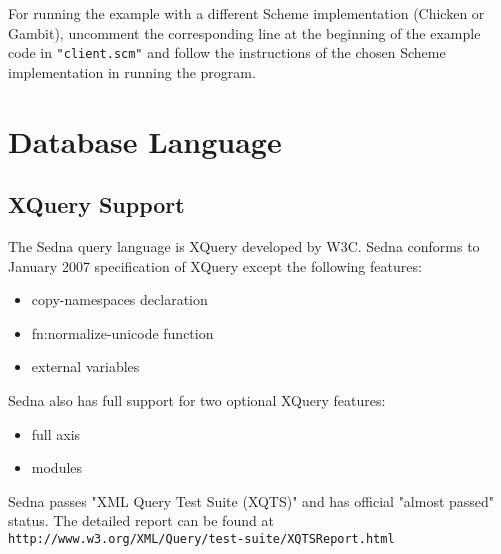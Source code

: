 \documentclass[a4paper,12pt]{article}
\begin{document}
For running the example with a different Scheme implementation (Chicken or
Gambit), uncomment the corresponding line at the beginning of the example code
in \texttt{"client.scm"} and follow the instructions of the chosen Scheme
implementation in running the program.




















%
%
\section{Database Language}
\label{sec:DBLang}

\subsection{XQuery Support}
\label{sec:xquery-support}
The Sedna query language is XQuery \cite{paper:query-language} developed by W3C.
Sedna conforms to January 2007 specification of XQuery except the following features:
\begin{itemize}
\item copy-namespaces declaration
\item fn:normalize-unicode function
\item external variables
\end{itemize}
Sedna also has full support for two optional XQuery features:
\begin{itemize}
\item full axis
\item modules
\end{itemize}

Sedna passes "XML Query Test Suite (XQTS)" and has official "almost passed" status. The detailed report can be found at \verb!http://www.w3.org/XML/Query/test-suite/XQTSReport.html!
\end{document}
